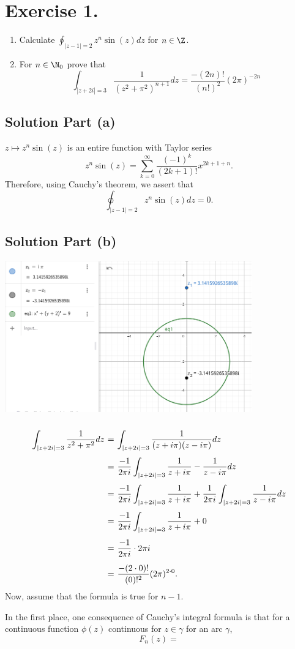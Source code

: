 \section*{Exercise 1.}

\begin{enumerate}[label=(\alph*)]
    \item Calculate $\displaystyle \oint_{|z-1| = 2} z^{n}\sin(z) dz$ for $n\in\Z$.
    \item For $n \in \N_0$ prove that
    \[ \int_{|z+2i| = 3} \frac{1}{(z^2+\pi^2)^{n+1}}dz = \frac{-(2n)!}{(n!)^2}(2\pi)^{-2n} \]
\end{enumerate}

\subsection*{Solution Part (a)}
$z \mapsto z^n \sin(z)$ is an entire function with Taylor series
\[ z^n \sin(z) = \sum_{k = 0}^\infty \frac{(-1)^k}{(2k+1)!}x^{2k+1+n}.  \]
Therefore, using Cauchy's theorem, we assert that
\[ \oint_{|z-1| = 2} z^{n}\sin(z) dz = 0.  \]

\subsection*{Solution Part (b)}

\begin{center}
    \includegraphics*[width=0.8\textwidth]{../pictures/hw3ex1pic1.png}
\end{center}

\[ \everymath{\displaystyle}
\arraycolsep=1.8pt\def\arraystretch{2.5}
\begin{array}{rcl}
    \int_{|z+2i| = 3} \frac{1}{z^2+\pi^2}dz & = & \int_{|z+2i| = 3} \frac{1}{(z+i\pi)(z-i\pi)}dz\\
    & = & \frac{-1}{2\pi i}\int_{|z+2i| = 3} \frac{1}{z+i\pi} - \frac{1}{z-i\pi}dz\\
    & = & \frac{-1}{2\pi i}\int_{|z+2i| = 3} \frac{1}{z+i\pi} + \frac{1}{2\pi i}\int_{|z+2i| = 3} \frac{1}{z-i\pi}dz\\
    & = & \frac{-1}{2\pi i}\int_{|z+2i| = 3} \frac{1}{z+i\pi} + 0\\
    & = &  \frac{-1}{2\pi i} \cdot 2\pi i\\
    & = & \frac{-(2\cdot 0)!}{(0)!^2} (2\pi)^{2\cdot 0}.
\end{array}  \]
Now, assume that the formula is true for $n-1$.

In the first place, one consequence of Cauchy's integral formula is that for a continuous function $\phi(z)$ continuous for $z \in \gamma$ for an arc $\gamma$,
\[ F_n(z) =  \]